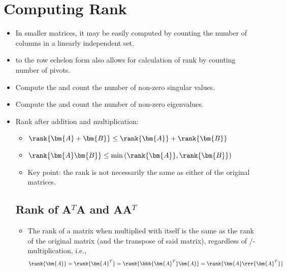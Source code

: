 \section{Computing Rank}\label{Computing Rank}
\begin{itemize}
  \item In smaller matrices, it may be easily computed by counting the number of columns in a linearly independent set.
  \item \hyperref[Row Echelon form]{} to the row echelon form also allows for calculation of rank by counting number of pivots.
  \item Compute the \hyperref[Singular Value Decomposition]{} and count the number of non-zero singular values.
  \item Compute the \hyperref[Eigendecomposition]{} and count the number of non-zero eigenvalues.
  
  \item Rank after addition and multiplication:
  \begin{itemize}
    \item \(\rank{\bm{A}+\bm{B}} \leq \rank{\bm{A}} + \rank{\bm{B}} \)
    \item \(\rank{\bm{A}\bm{B}} \leq \min{(\rank{\bm{A}},\rank{\bm{B}})} \)
    \item Key point: the rank is not necessarily the same as either of the original matrices.
  \end{itemize}
  
  \subsection{Rank of A\texorpdfstring{\(^T\)}{}A and AA\texorpdfstring{\(^T\)}{}}\label{Rank of ATA and AAT}
  \begin{itemize}
    \item The rank of a matrix when multiplied with itself is the same as the rank of the original matrix (and the transpose of said matrix), regardless of /-multiplication, i.e.,
    \[%
    \rank{\bm{A}}  = \rank{\bm{A}^T} = \rank{\bbb{\bm{A}^T}\bm{A}} = \rank{\bm{A}\rrr{\bm{A}^T}}
    \]%
    

\end{itemize}
\end{itemize}
